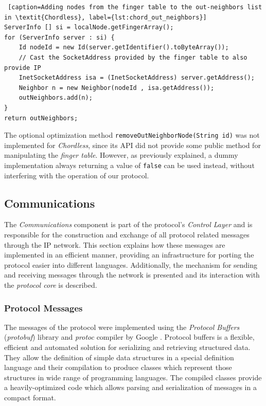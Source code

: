 \documentclass[a4paper,11pt,twoside]{report}
\newcommand{\classname}[1]{\texttt{#1}}
\begin{document}
\begin{description}
\begin{lstlisting} [caption=Adding nodes from the finger table to the out-neighbors list in \textit{Chordless}, label={lst:chord_out_neighbors}]
ServerInfo [] si = localNode.getFingerArray();
for (ServerInfo server : si) {
	Id nodeId = new Id(server.getIdentifier().toByteArray());
	// Cast the SocketAddress provided by the finger table to also provide IP
	InetSocketAddress isa = (InetSocketAddress) server.getAddress();
	Neighbor n = new Neighbor(nodeId , isa.getAddress());
	outNeighbors.add(n);
}		
return outNeighbors;
\end{lstlisting}

The optional optimization method \classname{removeOutNeighborNode(String id)} was not implemented for \textit{Chordless}, since its API did not provide some public method for manipulating the \textit{finger table}. However, as previously explained, a dummy implementation always returning a value of \classname{false} can be used instead, without interfering with the operation of our protocol.

\end{description}

\subsection{Communications}
\label{sec:communications_impl}

The \textit{Communications} component is part of the protocol's \textit{Control Layer} and is responsible for the construction and exchange of all protocol related messages through the IP network. This section explains how these messages are implemented in an efficient manner, providing an infrastructure for porting the protocol easier into different languages. Additionally, the mechanism for sending and receiving messages through the network is presented and its interaction with the \textit{protocol core} is described.


\subsubsection*{Protocol Messages}

The messages of the protocol were implemented using the \textit{Protocol Buffers} (\textit{protobuf}) library and \textit{protoc} compiler by Google \cite{Varda2008}. Protocol buffers is a flexible, efficient and automated solution for serializing and retrieving structured data. They allow the definition of simple data structures in a special definition language and their compilation to produce classes which represent those structures in wide range of programming languages. The compiled classes provide a heavily-optimized code which allows parsing and serialization of messages in a compact format. \\
\end{document}
